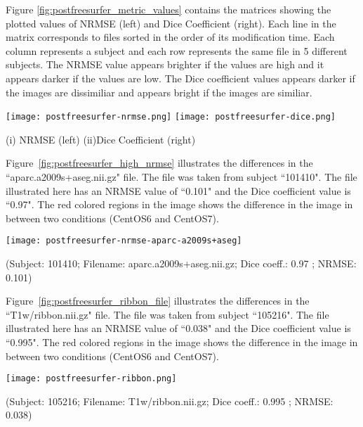 Figure \ref{fig:postfreesurfer_metric_values} contains the matrices showing the plotted values of NRMSE (left) and Dice Coefficient (right). Each line in the matrix corresponds to files sorted in the order of its modification time. Each column represents a subject and each row represents the same file in 5 different subjects. The NRMSE value appears brighter if the values are high and it appears darker if the values are low. The Dice coefficient values appears darker if the images are dissimiliar and appears bright if the images are similiar.

\hfill \break
\begin{center}
\texttt{[image: postfreesurfer-nrmse.png]}%
\texttt{[image: postfreesurfer-dice.png]}
\caption*{(i) NRMSE (left) (ii)Dice Coefficient (right)}
\label{fig:postfreesurfer_metric_values}
\end{center}
\hfill \break

Figure~\ref{fig:postfreesurfer_high_nrmse} illustrates the differences in the ``aparc.a2009s+aseg.nii.gz" file. The file was taken from subject ``101410". The file illustrated here has an NRMSE value of ``0.101" and the Dice coefficient value is ``0.97". The red colored regions in the image shows the difference in the image in between two conditions (CentOS6 and CentOS7).

\hfill \break
\begin{center}
\texttt{[image: postfreesurfer-nrmse-aparc-a2009s+aseg]}
\caption*{(Subject: 101410; Filename: aparc.a2009s+aseg.nii.gz; Dice coeff.: 0.97 ; NRMSE: 0.101)}
\label{fig:postfreesurfer_high_nrmse}
\end{center}
\hfill \break

Figure~\ref{fig:postfreesurfer_ribbon_file} illustrates the differences in the ``T1w/ribbon.nii.gz" file. The file was taken from subject ``105216". The file illustrated here has an NRMSE value of ``0.038" and the Dice coefficient value is ``0.995". The red colored regions in the image shows the difference in the image in between two conditions (CentOS6 and CentOS7).

\hfill \break
\begin{center}
\texttt{[image: postfreesurfer-ribbon.png]}
\caption*{(Subject: 105216; Filename: T1w/ribbon.nii.gz; Dice coeff.: 0.995 ; NRMSE: 0.038)}
\label{fig:postfreesurfer_ribbon_file}
\end{center}
\hfill \break

